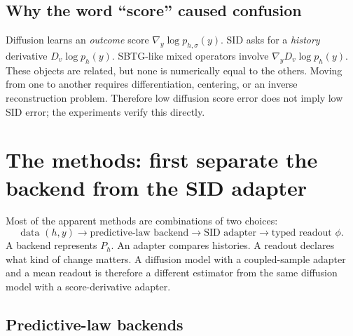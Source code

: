 \documentclass[11pt]{article}
\begin{document}
\subsection*{Why the word ``score'' caused confusion}

Diffusion learns an \emph{outcome} score $\nabla_y\log p_{h,\sigma}(y)$.  SID asks for
a \emph{history} derivative $D_v\log p_h(y)$.  SBTG-like mixed operators involve
$\nabla_yD_v\log p_h(y)$.  These objects are related, but none is numerically equal to
the others.  Moving from one to another requires differentiation, centering, or an
inverse reconstruction problem.  Therefore low diffusion score error does not imply
low SID error; the experiments verify this directly.

\newpage
\section{The methods: first separate the backend from the SID adapter}

Most of the apparent methods are combinations of two choices:
\[
\boxed{\text{data }(h,y)}
\longrightarrow
\boxed{\text{predictive-law backend}}
\longrightarrow
\boxed{\text{SID adapter}}
\longrightarrow
\boxed{\text{typed readout }\phi}.
\]
A backend represents $P_h$.  An adapter compares histories.  A readout declares what
kind of change matters.  A diffusion model with a coupled-sample adapter and a mean
readout is therefore a different estimator from the same diffusion model with a
score-derivative adapter.

\subsection{Predictive-law backends}
\end{document}
